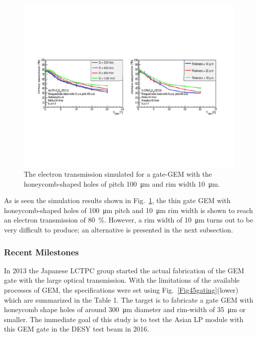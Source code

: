 \begin{figure}[htb!]
\begin{center}
\includegraphics[width=\columnwidth]{Tracker/TPC_Bonn/plots/TPC-Gate_Fig3gating.pdf}%
\caption{\label{Fig3gating} {The electron transmission simulated for a gate-GEM with the honeycomb-shaped holes of pitch \SI{100}{\micro\meter} and rim width \SI{10}{\micro\meter}.}}
\end{center}
\end{figure}

As is seen the simulation results shown in Fig.~\ref{Fig3gating}, the thin gate GEM with
honey\-comb-shaped holes of \SI{100}{\micro\meter} pitch and \SI{10}{\micro\meter} rim width is shown to reach
an electron transmission of \SI{80}{\percent}. However, a rim width of \SI{10}{\micro\meter} turns out to be very difficult to produce;
an alternative is presented in the next subsection.

\subsubsection{Recent Milestones}

In 2013 the Japanese LCTPC group started the actual fabrication of the GEM gate with the large
optical transmission. With the limitations of the available processes of GEM, the specifications
were set using  Fig.~\ref{Fig45gating}(lower)
which are summarized in the Table 1. The target is to fabricate a gate GEM with  honeycomb shape holes
of around \SI{300}{\micro\meter} diameter and  rim-width of \SI{35}{\micro\meter} or smaller. The immediate goal
of this study is to test the Asian LP module with this GEM gate in the DESY test beam in 2016.

